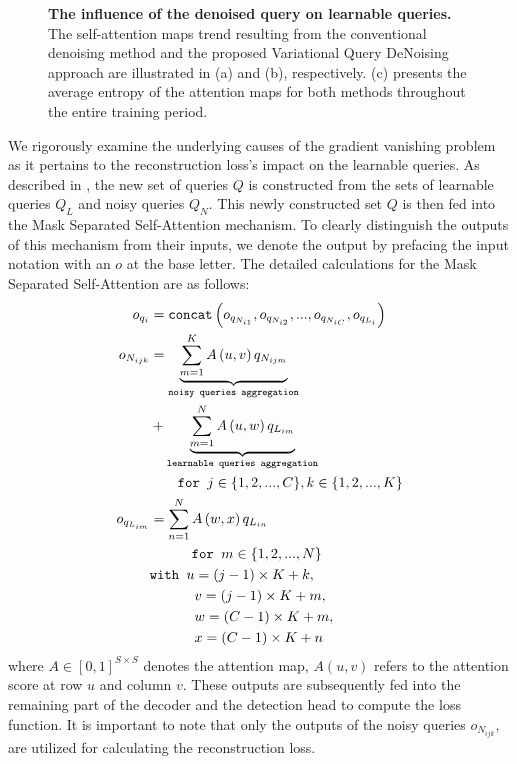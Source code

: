 \begin{figure}[h!]
    \centering
    
    \caption{\textbf{The influence of the denoised query on learnable queries.} The self-attention maps trend resulting from the conventional denoising method and the proposed Variational Query DeNoising approach are illustrated in (a) and (b), respectively. (c) presents the average entropy of the attention maps for both methods throughout the entire training period.}
    \label{fig:motivation_vdn}
\end{figure}

We rigorously examine the underlying causes of the gradient vanishing problem as it pertains to the reconstruction loss's impact on the learnable queries.
As described in , the new set of queries $Q$ is constructed from the sets of learnable queries $Q_L$ and noisy queries $Q_N$.
This newly constructed set $Q$ is then fed into the Mask Separated Self-Attention mechanism. To clearly distinguish the outputs of this mechanism from their inputs, we denote the output by prefacing the input notation with an $o$ at the base letter. The detailed calculations for the Mask Separated Self-Attention are as follows:
\begin{equation}
    \begin{aligned}
        o_{q_i} &= \texttt{concat}\left(o_{q_{N_{i1}}},o_{q_{N_{i2}}},...,o_{q_{N_{iC}}},o_{q_{L_i}}\right) \\
        o_{N_{ijk}} &= \underbrace{\sum_{m=1}^{K} A\left(u,v\right)q_{N_{ijm}}}_{\texttt{noisy queries aggregation}} \\ 
        &+ \underbrace{\sum_{m=1}^{N}A\left(u, w\right)q_{L_{im}}}_{\texttt{learnable queries aggregation}} \\ & \hspace{2em} \texttt{for } j\in \{1,2,...,C\},k\in \{1,2,...,K\} \\
        o_{q_{L_{im}}} &= \sum_{n=1}^N A\left(w, x\right)q_{L_{in}} \\
        & \hspace{3em} \texttt{for } m \in \{1,2,...,N\} \\
        & \texttt{with } 
        u = (j-1)\times K + k,\\
        & \hspace{3.2em} v = (j-1)\times K + m,\\
        & \hspace{3.2em} w = (C-1)\times K + m,\\
        & \hspace{3.2em} x = (C-1)\times K + n\\
    \end{aligned}
    \label{eq:forward_msa}
\end{equation}
where $A \in [0,1]^{S \times S}$ denotes the attention map, $A(u,v)$ refers to the attention score at row $u$ and column $v$.
These outputs are subsequently fed into the remaining part of the decoder and the detection head to compute the loss function. It is important to note that only the outputs of the noisy queries $o_{N_{ijk}}$, are utilized for calculating the reconstruction loss.

